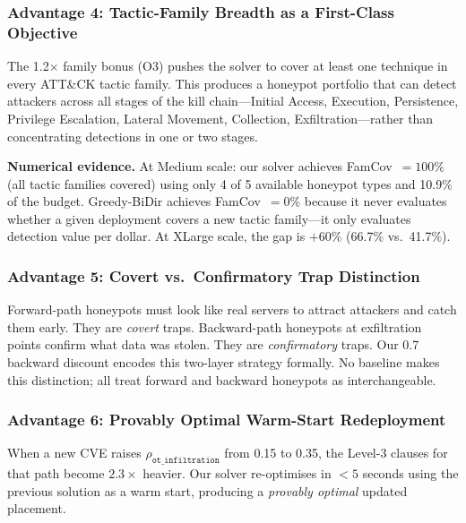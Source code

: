 \documentclass[journal]{IEEEtran}
\begin{document}
\subsubsection{Advantage 4: Tactic-Family Breadth as a
               First-Class Objective}

The 1.2$\times$ family bonus (O3) pushes the solver to
cover at least one technique in every ATT\&CK tactic
family.
This produces a honeypot portfolio that can detect
attackers across all stages of the kill chain---Initial
Access, Execution, Persistence, Privilege Escalation,
Lateral Movement, Collection, Exfiltration---rather than
concentrating detections in one or two stages.

\begin{examplebox}
\textbf{Numerical evidence.}
At Medium scale: our solver achieves FamCov~$=100\%$
(all tactic families covered) using only 4 of 5 available
honeypot types and 10.9\% of the budget.
Greedy-BiDir achieves FamCov~$=0\%$ because it never
evaluates whether a given deployment covers a new tactic
family---it only evaluates detection value per dollar.
At XLarge scale, the gap is $+60\%$ (66.7\% vs.\ 41.7\%).
\end{examplebox}

\subsubsection{Advantage 5: Covert vs.\ Confirmatory Trap
               Distinction}

Forward-path honeypots must look like real servers to
attract attackers and catch them early.
They are \emph{covert} traps.
Backward-path honeypots at exfiltration points confirm what
data was stolen.
They are \emph{confirmatory} traps.
Our 0.7 backward discount encodes this two-layer strategy
formally.
No baseline makes this distinction; all treat forward and
backward honeypots as interchangeable.

\subsubsection{Advantage 6: Provably Optimal Warm-Start
               Redeployment}

When a new CVE raises $\rho_{\texttt{ot\_infiltration}}$
from 0.15 to 0.35, the Level-3 clauses for that path
become $2.3\times$ heavier.
Our solver re-optimises in $<5$ seconds using the previous
solution as a warm start, producing a \emph{provably
optimal} updated placement.
\end{document}
